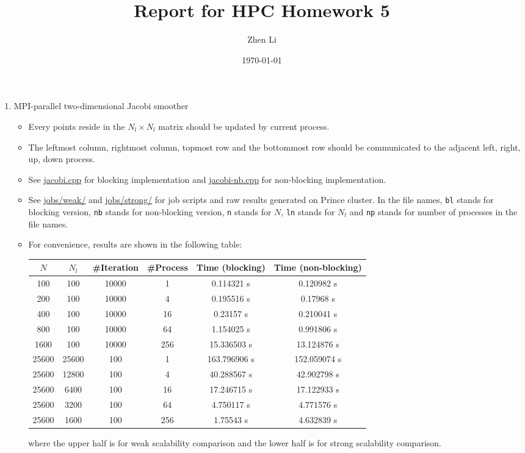 \documentclass{article}
\title{Report for HPC Homework 5}
\author{Zhen Li}
\date{\today}
\begin{document}
\maketitle

\begin{enumerate}
  \item MPI-parallel two-dimensional Jacobi smoother
  \begin{itemize}
    \item Every points reside in the $N_l \times N_l$ matrix should be updated
    by current process.

    \item The leftmost column, rightmost column, topmost row and the
    bottommost row should be communicated to the adjacent left, right, up,
    down process.

    \item See \url{jacobi.cpp} for blocking implementation and
    \url{jacobi-nb.cpp} for non-blocking implementation.

    \item See \url{jobs/weak/} and \url{jobs/strong/} for job scripts and raw
    results generated on Prince cluster. In the file names, \lstinline{bl}
    stands for blocking version, \lstinline{nb} stands for non-blocking
    version, \lstinline{n} stands for $N$, \lstinline{ln} stands for $N_l$ and
    \lstinline{np} stands for number of processes in the file names.

    \item For convenience, results are shown in the following table:
    \begin{center}
      \begin{tabular}{cccccc}
        \toprule
        $N$ & $N_l$ & \#Iteration & \#Process & Time (blocking) &
          Time (non-blocking) \\
        \midrule
        100   & 100   & 10000 & 1   & 0.114321   s & 0.120982   s \\
        200   & 100   & 10000 & 4   & 0.195516   s & 0.17968    s \\
        400   & 100   & 10000 & 16  & 0.23157    s & 0.210041   s \\
        800   & 100   & 10000 & 64  & 1.154025   s & 0.991806   s \\
        1600  & 100   & 10000 & 256 & 15.336503  s & 13.124876  s \\
        \midrule
        25600 & 25600 & 100   & 1   & 163.796906 s & 152.059074 s \\
        25600 & 12800 & 100   & 4   & 40.288567  s & 42.902798  s \\
        25600 & 6400  & 100   & 16  & 17.246715  s & 17.122933  s \\
        25600 & 3200  & 100   & 64  & 4.750117   s & 4.771576   s \\
        25600 & 1600  & 100   & 256 & 1.75543    s & 4.632839   s \\
        \bottomrule
      \end{tabular}
    \end{center}
    where the upper half is for weak scalability comparison and the lower half
    is for strong scalability comparison.


\end{itemize}
\end{enumerate}
\end{document}
